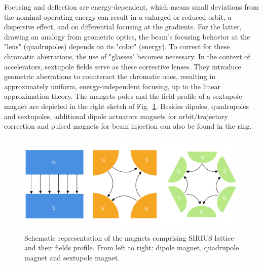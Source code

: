 Focusing and deflection are energy-dependent, which means small deviations from the nominal operating energy can result in a enlarged or reduced orbit, a dispersive effect, and on differential focusing at the gradients. For the latter, drawing an analogy from geometric optics, the beam's focusing behavior at the "lens" (quadrupoles) depends on its "color" (energy). To correct for these chromatic aberrations, the use of "glasses" becomes necessary. In the context of accelerators, sextupole fields serve as these corrective lenses. They introduce geometric aberrations to counteract the chromatic ones, resulting in approximately uniform, energy-independent focusing, up to the linear approximation theory. The mangets poles and the field profile of a sextupole magnet are depicted in the right sketch of Fig.~\ref{fig:magnets_fields}. Besides dipoles, quadrupoles and sextupoles, additional dipole actuators magnets for orbit/trajectory correction and pulsed magnets for beam injection can also be found in the ring.
\begin{figure}[htb]
    \includegraphics[width=\textwidth]{Images/magnets.pdf}
    \caption{Schematic representation of the magnets comprising SIRIUS lattice and their fields profile. From left to right: dipole magnet, quadrupole magnet and sextupole magnet.}
    \label{fig:magnets_fields}
\end{figure}

